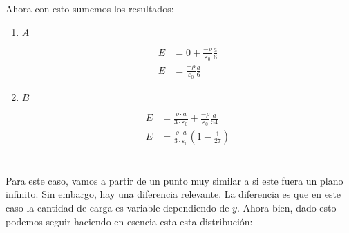 \documentclass{report}
\begin{document}
Ahora con esto sumemos los resultados:
\begin{enumerate}
  \item $A$

    \begin{align*}
      E &= 0 + \frac{-\rho}{\varepsilon_0} \frac{a}{6}\\
      E &= \frac{-\rho}{\varepsilon_0} \frac{a}{6}
    \end{align*}
  \item $B$

    \begin{align*}
      E &= \frac{\rho \cdot a}{3 \cdot \varepsilon_0} + \frac{-\rho}{\varepsilon_0} \frac{a}{54} \\
      E &= \frac{\rho \cdot a}{3 \cdot \varepsilon_0}\left( 1 - \frac{1}{27} \right)
    \end{align*}
\end{enumerate}

\chapter{}

Para este caso, vamos a partir de un punto muy similar a si este fuera un plano infinito. Sin embargo, hay una diferencia relevante. La diferencia es que en este caso la cantidad de carga es  variable dependiendo de $y$. Ahora bien, dado esto podemos seguir haciendo en esencia esta esta distribución:



\chapter{}

\section{}
\end{document}

